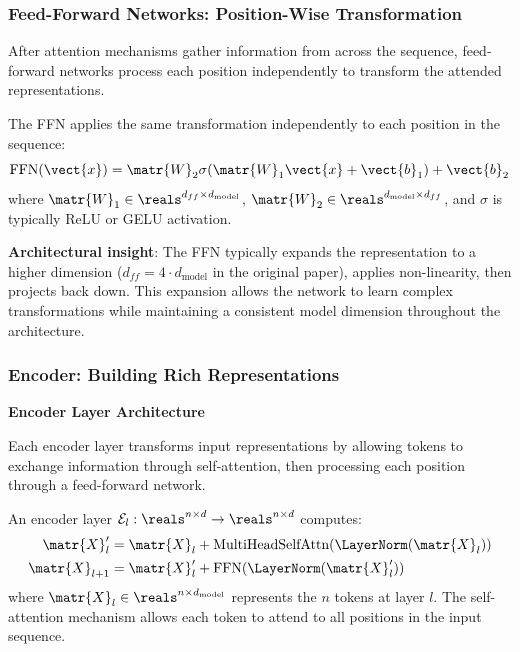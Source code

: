 \subsubsection{Feed-Forward Networks: Position-Wise Transformation}

After attention mechanisms gather information from across the sequence, feed-forward networks process each position independently to transform the attended representations.

\begin{definition}
  The FFN applies the same transformation independently to each position in the sequence:
  \begin{equation}
    \text{FFN}(\vect{x}) = \matr{W}_2 \sigma(\matr{W}_1 \vect{x} + \vect{b}_1) + \vect{b}_2
  \end{equation}
  where $\matr{W}_1 \in \reals^{d_{ff} \times d_{\text{model}}}$, $\matr{W}_2 \in \reals^{d_{\text{model}} \times d_{ff}}$, and $\sigma$ is typically ReLU or GELU activation.
\end{definition}

\textbf{Architectural insight}: The FFN typically expands the representation to a higher dimension ($d_{ff} = 4 \cdot d_{\text{model}}$ in the original paper), applies non-linearity, then projects back down. This expansion allows the network to learn complex transformations while maintaining a consistent model dimension throughout the architecture.

\subsubsection{Encoder: Building Rich Representations}

\textbf{Encoder Layer Architecture}

Each encoder layer transforms input representations by allowing tokens to exchange information through self-attention, then processing each position through a feed-forward network.

\begin{definition}
  An encoder layer $\mathcal{E}_l: \reals^{n \times d} \to \reals^{n \times d}$ computes:
  \begin{align}
    \matr{X}'_l &= \matr{X}_l + \text{MultiHeadSelfAttn}(\LayerNorm(\matr{X}_l)) \label{eq:enc_attn}\\
    \matr{X}_{l+1} &= \matr{X}'_l + \text{FFN}(\LayerNorm(\matr{X}'_l)) \label{eq:enc_ffn}
  \end{align}
  where $\matr{X}_l \in \reals^{n \times d_{\text{model}}}$ represents the $n$ tokens at layer $l$. The self-attention mechanism allows each token to attend to all positions in the input sequence.
\end{definition}

